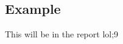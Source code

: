 \documentclass[../report.tex]{subfiles}
\begin{document}
\subsection{Example}


 This will be in the report lol;9
\end{document}
